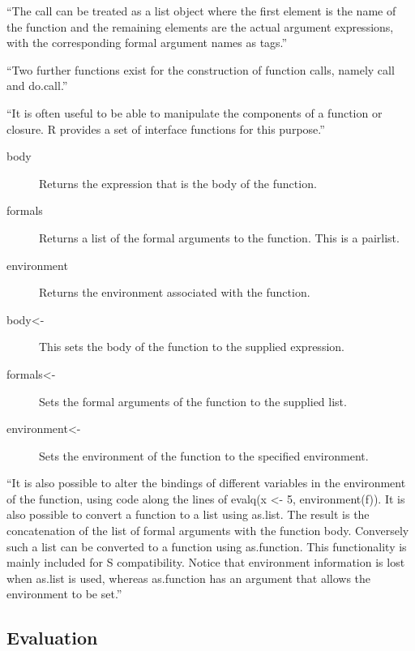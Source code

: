 ``The call can be treated as a list object where the first element is the name of the function and the remaining elements are the actual argument expressions, with the corresponding formal argument names as tags.''

``Two further functions exist for the construction of function calls, namely call and do.call.''

``It is often useful to be able to manipulate the components of a function or closure. R provides a set of interface functions for this purpose.''

\begin{description}
\item [body]
Returns the expression that is the body of the function.
\item [formals]
Returns a list of the formal arguments to the function. This is a pairlist.
\item [environment]
Returns the environment associated with the function.
\item [body<-]
This sets the body of the function to the supplied expression.
\item [formals<-]
Sets the formal arguments of the function to the supplied list.
\item [environment<-]
Sets the environment of the function to the specified environment.
\end{description}

``It is also possible to alter the bindings of different variables in the environment of the function, using code along the lines of evalq(x <- 5, environment(f)).
It is also possible to convert a function to a list using as.list. The result is the concatenation of the list of formal arguments with the function body. Conversely such a list can be converted to a function using as.function. This functionality is mainly included for S compatibility. Notice that environment information is lost when as.list is used, whereas as.function has an argument that allows the environment to be set.''


\subsection{Evaluation}
\label{sect:eval}



\label{subsub:rlazy}

